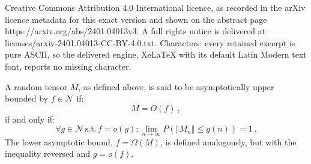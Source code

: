 \documentclass[10pt,a4paper]{amsart}
\begin{document}
Creative Commons Attribution 4.0 International licence, as recorded in the arXiv licence metadata for this exact version and shown on the abstract page https://arxiv.org/abs/2401.04013v3. A full rights notice is delivered at licenses/arxiv-2401.04013-CC-BY-4.0.txt. Characters: every retained excerpt is pure ASCII, so the delivered engine, XeLaTeX with its default Latin Modern text font, reports no missing character.
\begin{definition}
\label{def:BoundTenMag}
\textup{A random tensor \(M\), as defined above, is said to be asymptotically upper bounded by \(f\in\mathcal{N}\) if:
\begin{equation}
M= O\left(f\right) \ ,
\end{equation}
if and only if:
\begin{equation}
\forall g\in\mathcal{N}\,\text{s.t.}\,f=o\left(g\right):\lim_{n\rightarrow\infty}P\left(\left\Vert M_n\right\Vert \leq g\left(n\right)\right)=1\ .
\label{eq:BoundTenMag1}
\end{equation}
The lower asymptotic bound, \(f=\Omega (M)\), is defined analogously, but with the inequality reversed and \(g=o(f)\).
}
\end{definition}

\end{document}
